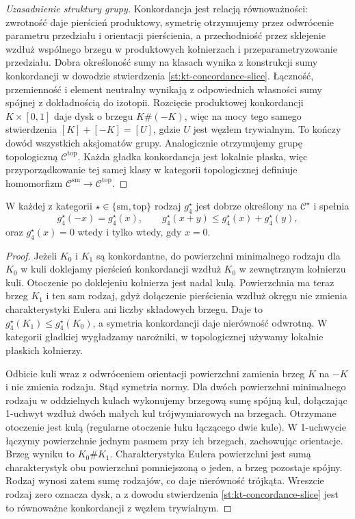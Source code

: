 \begin{proof}[Uzasadnienie struktury grupy]
Konkordancja jest relacją równoważności:
zwrotność daje pierścień produktowy, symetrię
otrzymujemy przez odwrócenie parametru przedziału
i orientacji pierścienia, a przechodniość przez
sklejenie wzdłuż wspólnego brzegu w produktowych
kołnierzach i przeparametryzowanie przedziału.
Dobra określoność sumy na klasach wynika z
konstrukcji sumy konkordancji w dowodzie
stwierdzenia \ref{st:kt-concordance-slice}.
Łączność, przemienność i element neutralny
wynikają z odpowiednich własności sumy spójnej
z dokładnością do izotopii. Rozcięcie produktowej
konkordancji $K\times[0,1]$ daje dysk o brzegu
$K\#(-K)$, więc na mocy tego samego stwierdzenia
$[K]+[-K]=[U]$, gdzie $U$ jest węzłem trywialnym.
To kończy dowód wszystkich aksjomatów grupy.
Analogicznie otrzymujemy grupę topologiczną
$\mathcal C^{\mathrm{top}}$. Każda gładka
konkordancja jest lokalnie płaska, więc
przyporządkowanie tej samej klasy w kategorii
topologicznej definiuje homomorfizm
$\mathcal C^{\mathrm{sm}}\to\mathcal C^{\mathrm{top}}$.
\end{proof}

\begin{stwierdzenie}
\label{st:kt-concordance-genus-norm}
W każdej z kategorii $\star\in\{\mathrm{sm},\mathrm{top}\}$
rodzaj $g_4^\star$ jest dobrze określony na
$\mathcal C^\star$ i spełnia
\[
g_4^\star(-x)=g_4^\star(x),\qquad
g_4^\star(x+y)\le g_4^\star(x)+g_4^\star(y),
\]
oraz $g_4^\star(x)=0$ wtedy i tylko wtedy,
gdy $x=0$.
\end{stwierdzenie}
\begin{proof}
Jeżeli $K_0$ i $K_1$ są konkordantne,
do powierzchni minimalnego rodzaju dla $K_0$
w kuli doklejamy pierścień konkordancji wzdłuż
$K_0$ w zewnętrznym kołnierzu kuli.
Otoczenie po doklejeniu kołnierza jest nadal kulą.
Powierzchnia ma teraz brzeg $K_1$ i ten sam
rodzaj, gdyż dołączenie pierścienia wzdłuż
okręgu nie zmienia charakterystyki Eulera
ani liczby składowych brzegu.
Daje to $g_4^\star(K_1)\le g_4^\star(K_0)$,
a symetria konkordancji daje nierówność odwrotną.
W kategorii gładkiej wygładzamy narożniki,
w topologicznej używamy lokalnie płaskich kołnierzy.

Odbicie kuli wraz z odwróceniem orientacji
powierzchni zamienia brzeg $K$ na $-K$
i nie zmienia rodzaju. Stąd symetria normy.
Dla dwóch powierzchni minimalnego rodzaju
w oddzielnych kulach wykonujemy brzegową
sumę spójną kul, dołączając 1-uchwyt wzdłuż
dwóch małych kul trójwymiarowych na brzegach.
Otrzymane otoczenie jest kulą (regularne
otoczenie łuku łączącego dwie kule).
W 1-uchwycie łączymy powierzchnie jednym
pasmem przy ich brzegach, zachowując orientacje.
Brzeg wyniku to $K_0\#K_1$. Charakterystyka
Eulera powierzchni jest sumą charakterystyk
obu powierzchni pomniejszoną o jeden, a brzeg
pozostaje spójny. Rodzaj wynosi zatem sumę
rodzajów, co daje nierówność trójkąta.
Wreszcie rodzaj zero oznacza dysk, a z
dowodu stwierdzenia \ref{st:kt-concordance-slice}
jest to równoważne konkordancji z węzłem
trywialnym.
\end{proof}

